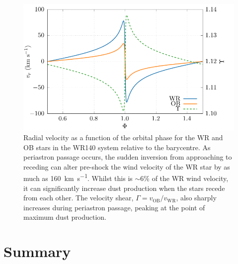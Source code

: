 \documentclass[fleqn,usenatbib]{mnras}
\newcommand{\rms}[1]{\ensuremath{_{\text{#1}}}}
\begin{document}
\begin{figure}
  \centering
  \includegraphics[width=\linewidth]{assets/radial-velocity/radial-shear.pdf}
  \caption[Radial velocity as a function of the orbital phase for the WR and OB stars in the WR140 system]{Radial velocity as a function of the orbital phase for the WR and OB stars in the WR140 system relative to the barycentre. As periastron passage occurs, the sudden inversion from approaching to receding can alter pre-shock the wind velocity of the WR star by as much as \SI{160}{\kilo\metre\per\second}. Whilst this is $\sim 6\%$ of the WR wind velocity, it can significantly increase dust production when the stars recede from each other. The velocity shear, $\Gamma = v\rms{OB}/v\rms{WR}$, also sharply increases during periastron passage, peaking at the point of maximum dust production.}
  \label{fig:p2-shear}
\end{figure}



\section{Summary}
\label{sec:p2-conclusion}
\end{document}
